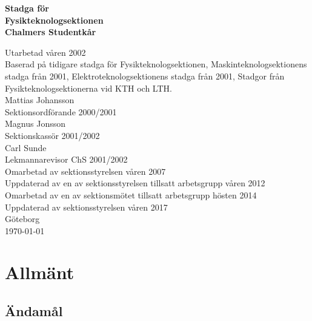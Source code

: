 \documentclass[11pt,a4paper]{article}
\begin{document}

\setlength{\headheight}{14pt}

  \begin{center}
    \textbf{\Huge{Stadga för}}\\[3mm]
    \textbf{\Huge{Fysikteknologsektionen}}\\
    \vspace{.7 cm}
    \textbf{\Large{Chalmers Studentkår}}


    \vfill

    Utarbetad våren 2002\\[5mm]
    Baserad på tidigare stadga för Fysikteknologsektionen,
    Maskinteknologsektionens stadga från 2001, Elektroteknologsektionens
    stadga från 2001, Stadgor från Fysikteknologsektionerna vid KTH och
LTH.\\[5mm]
    Mattias Johansson\\
    Sektionsordförande 2000/2001\\[5mm]
    Magnus Jonsson\\
    Sektionskassör 2001/2002\\[5mm]
    Carl Sunde\\
    Lekmannarevisor ChS 2001/2002\\[5mm]
    Omarbetad av sektionsstyrelsen våren 2007\\[5mm]
    Uppdaterad av en av sektionsstyrelsen tillsatt arbetsgrupp våren 2012\\[5mm]
    Omarbetad av en av sektionsmötet tillsatt arbetsgrupp hösten 2014\\[5mm]
    Uppdaterad av sektionsstyrelsen våren 2017\\
    \vspace{.3 cm}
    \small{Göteborg}\\
    \small{\today}
  \end{center}

\clearpage


\tableofcontents

\clearpage



\section{Allmänt}

\subsection{Ändamål}
\end{document}
